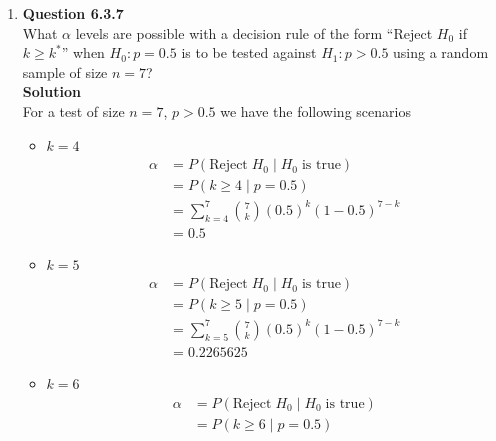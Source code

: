\documentclass{uofa-eng-assignment}
\begin{document}
\begin{enumerate}
    \item[]
        \textbf{Question 6.3.7} \\
        What $\alpha$ levels are possible with a decision rule of the form
        ``Reject $H_0$ if $k \geq k^*$'' when $H_0:p=0.5$ is to be tested against
        $H_1:p > 0.5$ using a random sample of size $n = 7$? \\
        \textbf{Solution} \\
        For a test of size $n = 7$, $p > 0.5$ we have the following scenarios
        \begin{itemize}
            \item $k = 4$
                  \begin{align*}
                      \alpha & = P(\text{Reject}\;H_0\;|\;H_0\;\text{is true})       \\
                             & = P(k \geq 4\;|\;p= 0.5)                              \\
                             & = \sum_{k=4}^{7} \binom{7}{k} (0.5)^k (1 - 0.5)^{7-k} \\
                             & = 0.5
                  \end{align*}
            \item $k = 5$
                  \begin{align*}
                      \alpha & = P(\text{Reject}\;H_0\;|\;H_0\;\text{is true})       \\
                             & = P(k \geq 5\;|\;p= 0.5)                              \\
                             & = \sum_{k=5}^{7} \binom{7}{k} (0.5)^k (1 - 0.5)^{7-k} \\
                             & = 0.2265625
                  \end{align*}
            \item $k = 6$
                  \begin{align*}
                      \alpha & = P(\text{Reject}\;H_0\;|\;H_0\;\text{is true})       \\
                             & = P(k \geq 6\;|\;p= 0.5)                              \\

\end{align*}
\end{itemize}
\end{enumerate}
\end{document}
